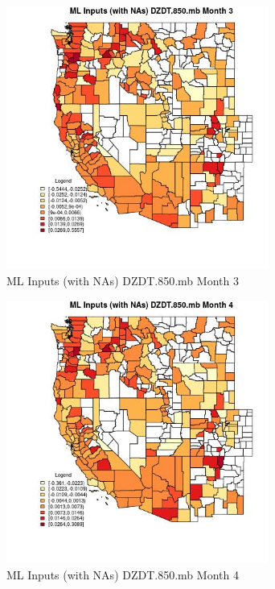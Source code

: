 \clearpage 

\begin{figure} 
\centering  
\includegraphics[width=0.77\textwidth]{Code_Outputs/Report_ML_input_PM25_Step4_part_e_de_duplicated_aves_compiled_2019-05-21wNAs_CountyDZDT850mbmedianMonth3.jpg} 
\caption{\label{fig:Report_ML_input_PM25_Step4_part_e_de_duplicated_aves_compiled_2019-05-21wNAsCountyDZDT850mbmedianMonth3}ML Inputs (with NAs) DZDT.850.mb Month 3} 
\end{figure} 
 

\begin{figure} 
\centering  
\includegraphics[width=0.77\textwidth]{Code_Outputs/Report_ML_input_PM25_Step4_part_e_de_duplicated_aves_compiled_2019-05-21wNAs_CountyDZDT850mbmedianMonth4.jpg} 
\caption{\label{fig:Report_ML_input_PM25_Step4_part_e_de_duplicated_aves_compiled_2019-05-21wNAsCountyDZDT850mbmedianMonth4}ML Inputs (with NAs) DZDT.850.mb Month 4} 
\end{figure} 
 

